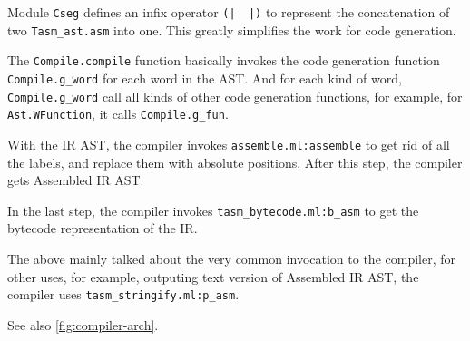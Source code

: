 \documentclass{report}
\newcommand{\mtilde}[1]{\textasciitilde}
\begin{document}
  \begin{mdframed}[style=detail]
    Module \texttt{Cseg} defines an infix operator \texttt{(|\mtilde ~\mtilde ~|)} to represent the concatenation of two \texttt{Tasm\_ast.asm} into one. This greatly simplifies the work for code generation.

    The \texttt{Compile.compile} function basically invokes the code generation function \texttt{Compile.g\_word} for each word in the AST. And for each kind of word, \texttt{Compile.g\_word} call all kinds of other code generation functions, for example, for \texttt{Ast.WFunction}, it calls \texttt{Compile.g\_fun}.
  \end{mdframed}

  With the IR AST, the compiler invokes \texttt{assemble.ml:assemble} to get rid of all the labels, and replace them with absolute positions. After this step, the compiler gets Assembled IR AST.

  In the last step, the compiler invokes \texttt{tasm\_bytecode.ml:b\_asm} to get the bytecode representation of the IR.

  \begin{mdframed}[style=hint]
  The above mainly talked about the very common invocation to the compiler, for other uses, for example, outputing text version of Assembled IR AST, the compiler uses \texttt{tasm\_stringify.ml:p\_asm}.

  See also \autoref{fig:compiler-arch}.
  \end{mdframed}
\end{document}
